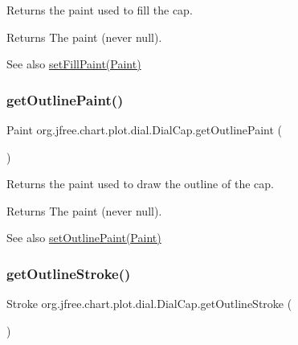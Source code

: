 Returns the paint used to fill the cap.

\begin{DoxyReturn}{Returns}
The paint (never {\ttfamily null}).
\end{DoxyReturn}
\begin{DoxySeeAlso}{See also}
\mbox{\hyperlink{classorg_1_1jfree_1_1chart_1_1plot_1_1dial_1_1_dial_cap_a2fc72d3eee10eda463f89cf4590ebe01}{set\+Fill\+Paint(\+Paint)}} 
\end{DoxySeeAlso}
\mbox{\label{classorg_1_1jfree_1_1chart_1_1plot_1_1dial_1_1_dial_cap_ae42cbd4fbc603f98a00e9bcd9e90365c}} 
\subsubsection{\texorpdfstring{get\+Outline\+Paint()}{getOutlinePaint()}}
{\footnotesize\ttfamily Paint org.\+jfree.\+chart.\+plot.\+dial.\+Dial\+Cap.\+get\+Outline\+Paint (\begin{DoxyParamCaption}{ }\end{DoxyParamCaption})}

Returns the paint used to draw the outline of the cap.

\begin{DoxyReturn}{Returns}
The paint (never {\ttfamily null}).
\end{DoxyReturn}
\begin{DoxySeeAlso}{See also}
\mbox{\hyperlink{classorg_1_1jfree_1_1chart_1_1plot_1_1dial_1_1_dial_cap_af4948903ce3b7d78acc4cc715c5f6ab9}{set\+Outline\+Paint(\+Paint)}} 
\end{DoxySeeAlso}
\mbox{\label{classorg_1_1jfree_1_1chart_1_1plot_1_1dial_1_1_dial_cap_a6bb21a21b3417917b4e1a9e3a89c9c9a}} 
\subsubsection{\texorpdfstring{get\+Outline\+Stroke()}{getOutlineStroke()}}
{\footnotesize\ttfamily Stroke org.\+jfree.\+chart.\+plot.\+dial.\+Dial\+Cap.\+get\+Outline\+Stroke (\begin{DoxyParamCaption}{ }\end{DoxyParamCaption})}

